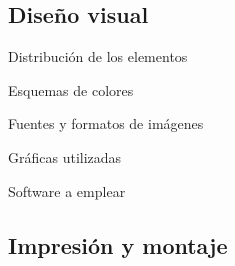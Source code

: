 \documentclass[xcolor=svgnames,compress]{beamer}
\begin{document}
\subsection{Diseño visual}

\begin{frame}{Distribución de los elementos}
  
\end{frame}

\begin{frame}{Esquemas de colores}
  
\end{frame}

\begin{frame}{Fuentes y formatos de imágenes}
  
\end{frame}

\begin{frame}{Gráficas utilizadas}
  
\end{frame}

\begin{frame}{Software a emplear}
  
\end{frame}

\subsection{Impresión y montaje}
\end{document}
